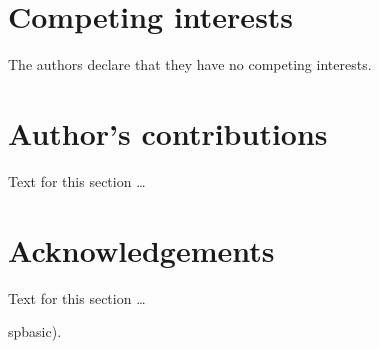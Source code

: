\documentclass{bmcart}
\begin{document}
\begin{backmatter}

\section*{Competing interests}
  The authors declare that they have no competing interests.

\section*{Author's contributions}
    Text for this section \ldots

\section*{Acknowledgements}
  Text for this section \ldots

spbasic).       %




\end{backmatter}
\end{document}
